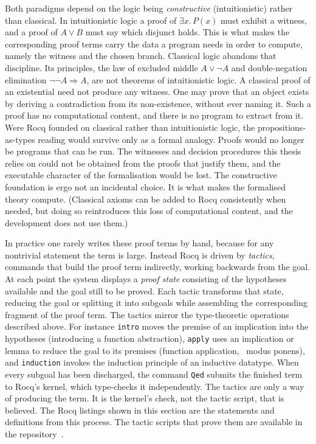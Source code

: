 Both paradigms depend on the logic being \emph{constructive}
(intuitionistic) rather than classical. In
intuitionistic logic a proof of $\exists x.\,P(x)$ must exhibit a witness,
and a proof of $A \vee B$ must say which disjunct holds. This is what makes
the corresponding proof terms carry the data a program needs in order to compute,
namely the witness and the chosen branch. Classical logic abandons that discipline.
Its principles, the law of excluded middle $A \vee \neg A$ and
double-negation elimination $\neg\neg A \Rightarrow A$, are not theorems of
intuitionistic logic. A classical proof of an existential need not produce any
witness. One may prove that an object exists by deriving a contradiction from
its non-existence, without ever naming it. Such a proof has no computational
content, and there is no program to extract from it. Were Rocq founded on classical
rather than intuitionistic logic, the propositions-as-types reading would survive
only as a formal analogy. Proofs would no longer be programs that can be run. The
witnesses and decision procedures this thesis relies on could not be obtained from
the proofs that justify them, and the executable character of the formalisation
would be lost. The constructive foundation is ergo not an incidental choice. It
is what makes the formalised theory compute. (Classical axioms can be
added to Rocq consistently when needed, but doing so reintroduces
this loss of computational content, and the development does not use them.)

In practice one rarely writes these proof terms by hand, because for any nontrivial
statement the term is large. Instead Rocq is driven by \emph{tactics}, commands
that build the proof term indirectly, working backwards from the goal. At each point
the system displays a \emph{proof state} consisting of the hypotheses
available and the goal still to be proved. Each tactic transforms that state,
reducing the goal or splitting it into subgoals while assembling
the corresponding fragment of the proof term. The tactics mirror the
type-theoretic operations described above. For instance \texttt{intro} moves the
premise of an implication into the hypotheses (introducing a function abstraction),
\texttt{apply} uses an implication or lemma to reduce the goal to its premises
(function application, \ie\ modus ponens), and \texttt{induction} invokes the
induction principle of an inductive datatype. When every subgoal has been
discharged, the command \texttt{Qed} submits the finished term to Rocq's
kernel, which type-checks it independently. The tactics are only a
way of producing the term. It is the kernel's check, not the tactic
script, that is believed. The Rocq listings shown in this section are the
statements and definitions from this process. The tactic
scripts that prove them are available in the repository~\cite{OurRocqRepo}.

